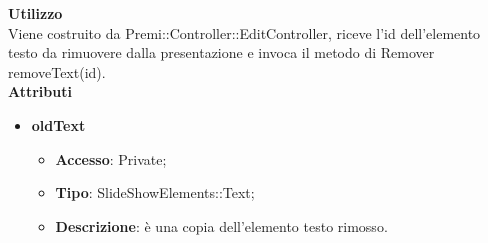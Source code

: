 {{{	\textbf{Utilizzo}\\
		\indent Viene costruito da Premi::Controller::EditController, riceve l’id dell’elemento testo da rimuovere dalla presentazione e invoca il metodo di Remover removeText(id).\\
	\textbf{Attributi}
	\begin{itemize}
		\item \textbf{oldText}
		\begin{itemize}
			\item \textbf{Accesso}: Private;
			\item \textbf{Tipo}: SlideShowElements::Text;
			\item \textbf{Descrizione}: è una copia dell’elemento testo rimosso. 
		\end{itemize}
	\end{itemize}
	
}}}
